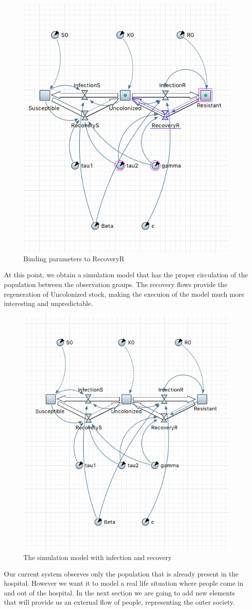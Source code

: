 \begin{figure}[H]
  \centering
  \includegraphics[height=0.6\textwidth]{img/screens/recovery/recovery9}
  \caption{Binding parameters to RecoveryR}
\end{figure}

At this point, we obtain a simulation model that has the proper circulation of the population between the observation groups. The recovery flows provide the regeneration of Uncolonized stock, making the execuion of the model much more interesting and unpredictable.

\begin{figure}[H]
  \centering
  \includegraphics[height=0.6\textwidth]{img/screens/recovery/recovery11}
  \caption{The simulation model with infection and recovery}
\end{figure}

Our current system observes only the population that is already present in the hospital. However we want it to model a real life situation where people come in and out of the hospital. In the next section we are going to add new elements that will provide us an external flow of people, representing the outer society.